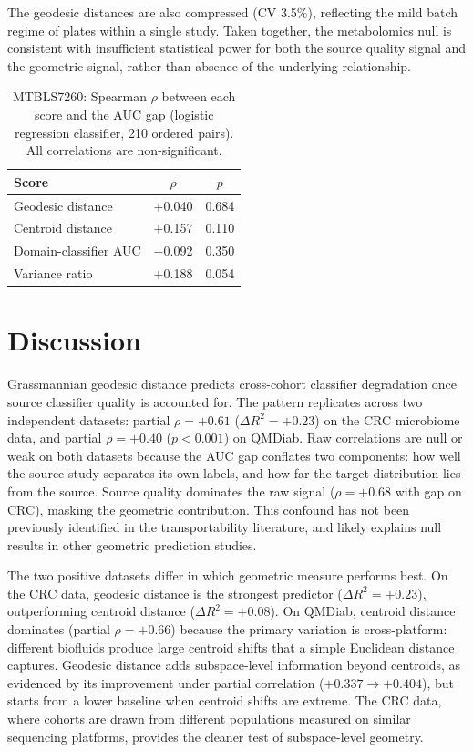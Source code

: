 \documentclass{article}
\begin{document}
The geodesic distances are also compressed (CV 3.5\%), reflecting the mild batch regime of plates within a single study. Taken together, the metabolomics null is consistent with insufficient statistical power for both the source quality signal and the geometric signal, rather than absence of the underlying relationship.

\begin{table}[t]
\centering
\caption{MTBLS7260: Spearman $\rho$ between each score and the AUC gap (logistic regression classifier, 210 ordered pairs). All correlations are non-significant.}
\label{tab:baselines_metab}
\begin{tabular}{lcc}
\toprule
Score & $\rho$ & $p$ \\
\midrule
Geodesic distance     & $+$0.040 & 0.684 \\
Centroid distance     & $+$0.157 & 0.110 \\
Domain-classifier AUC & $-$0.092 & 0.350 \\
Variance ratio        & $+$0.188 & 0.054 \\
\bottomrule
\end{tabular}
\end{table}


\section{Discussion}
\label{sec:discussion}

Grassmannian geodesic distance predicts cross-cohort classifier degradation once source classifier quality is accounted for. The pattern replicates across two independent datasets: partial $\rho = +0.61$ ($\Delta R^2 = +0.23$) on the CRC microbiome data, and partial $\rho = +0.40$ ($p < 0.001$) on QMDiab. Raw correlations are null or weak on both datasets because the AUC gap conflates two components: how well the source study separates its own labels, and how far the target distribution lies from the source. Source quality dominates the raw signal ($\rho = +0.68$ with gap on CRC), masking the geometric contribution. This confound has not been previously identified in the transportability literature, and likely explains null results in other geometric prediction studies.

The two positive datasets differ in which geometric measure performs best. On the CRC data, geodesic distance is the strongest predictor ($\Delta R^2 = +0.23$), outperforming centroid distance ($\Delta R^2 = +0.08$). On QMDiab, centroid distance dominates (partial $\rho = +0.66$) because the primary variation is cross-platform: different biofluids produce large centroid shifts that a simple Euclidean distance captures. Geodesic distance adds subspace-level information beyond centroids, as evidenced by its improvement under partial correlation ($+0.337 \to +0.404$), but starts from a lower baseline when centroid shifts are extreme. The CRC data, where cohorts are drawn from different populations measured on similar sequencing platforms, provides the cleaner test of subspace-level geometry.
\end{document}
